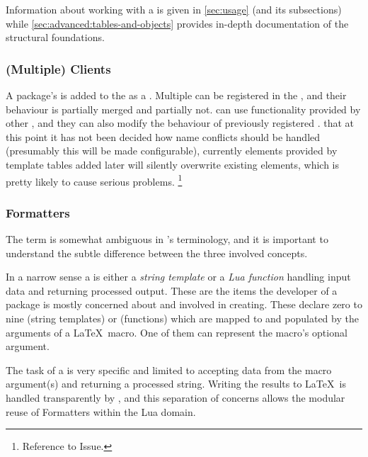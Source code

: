 \documentclass[12pt]{scrartcl}
\begin{document}
Information about working with a  is given in
\vref{sec:usage} (and its subsections) while
\vref{sec:advanced:tables-and-objects} provides in-depth documentation of
the structural foundations.


\subsubsection{(Multiple) Clients}
\label{sec:intro-multiple-clients}

A package's  is added to the  as a
.  Multiple  can be registered in the
, and their behaviour is partially merged and partially
not.   can use functionality provided by other
, and they can also modify the behaviour of previously
registered .   that at this point it has not
been decided how name conflicts should be handled (presumably this will be made
configurable), currently elements provided by template tables added later will
silently overwrite existing elements, which is pretty likely to cause serious
problems.%
\footnote{ Reference to Issue.}


\subsubsection{Formatters}
\label{sec:intro-formatters}

The term  is somewhat ambiguous in \luaformatters's terminology, and it is important to understand the subtle difference between the three involved concepts.

In a narrow sense a  is either a \emph{string template} or a
\emph{Lua function} handling input data and returning processed output.  These
are the items the developer of a package is mostly concerned about and involved
in creating.  These  declare zero to nine
 (string templates) or  (functions) which are mapped to and populated by the
arguments of a \LaTeX\ macro.  One of them can represent the macro's optional
argument.

The task of a  is very specific and limited to accepting data
from the macro argument(s) and returning a processed string.  Writing the
results to \LaTeX\ is handled transparently by \luaformatters, and this
separation of concerns allows the modular reuse of Formatters within the Lua
domain.
\end{document}
